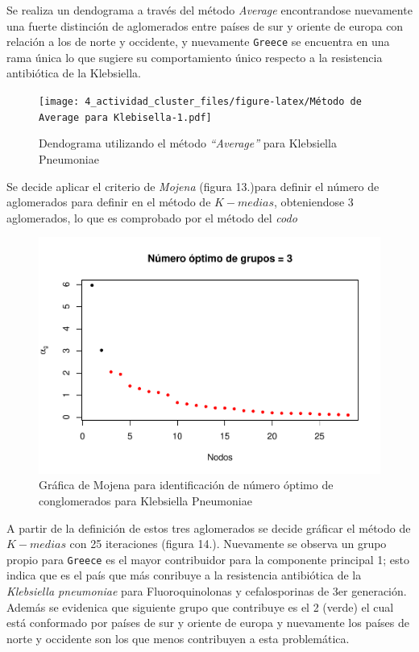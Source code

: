 \documentclass[
]{article}
\begin{document}
Se realiza un dendograma a través del método \emph{Average}
encontrandose nuevamente una fuerte distinción de aglomerados entre
países de sur y oriente de europa con relación a los de norte y
occidente, y nuevamente \texttt{Greece} se encuentra en una rama única
lo que sugiere su comportamiento único respecto a la resistencia
antibiótica de la Klebsiella.

\begin{figure}
\centering
\texttt{[image: 4\_actividad\_cluster\_files/figure-latex/Método de Average para Klebisella-1.pdf]}
\caption{Dendograma utilizando el método \emph{``Average''} para
Klebsiella Pneumoniae}
\end{figure}

Se decide aplicar el criterio de \emph{Mojena} (figura 13.)para definir
el número de aglomerados para definir en el método de \(K-medias\),
obteniendose 3 aglomerados, lo que es comprobado por el método del
\emph{codo}

\begin{figure}
\centering
\includegraphics{4_actividad_cluster_files/figure-latex/Mojena Klebsiella-1.pdf}
\caption{Gráfica de Mojena para identificación de número óptimo de
conglomerados para Klebsiella Pneumoniae}
\end{figure}

A partir de la definición de estos tres aglomerados se decide gráficar
el método de \(K-medias\) con 25 iteraciones (figura 14.). Nuevamente se
observa un grupo propio para \texttt{Greece} es el mayor contribuidor
para la componente principal 1; esto indica que es el país que más
conribuye a la resistencia antibiótica de la \emph{Klebsiella
pneumoniae} para Fluoroquinolonas y cefalosporinas de 3er generación.
Además se evidenica que siguiente grupo que contribuye es el 2 (verde)
el cual está conformado por países de sur y oriente de europa y
nuevamente los países de norte y occidente son los que menos contribuyen
a esta problemática.
\end{document}

